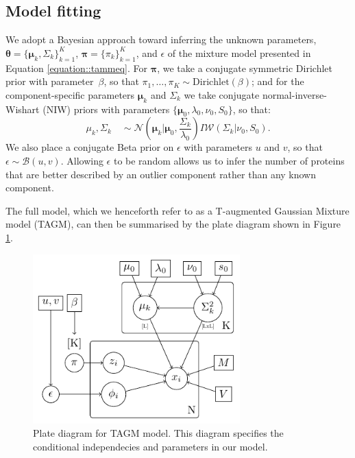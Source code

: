 \documentclass[12pt,english]{article}
\begin{document}
\subsection{Model fitting}
We adopt a Bayesian approach toward inferring the unknown parameters, $\boldsymbol{\theta} = \{\boldsymbol{\mu}_k, \Sigma_k \}_{k = 1}^K$, $\boldsymbol{\pi} = \{\pi_k\}_{k = 1}^K$, and $\epsilon$ of the mixture model presented in Equation \eqref{equation::tammeq}.  For $\boldsymbol{\pi}$, we take a conjugate symmetric Dirichlet prior with parameter~$\beta$, so that $\pi_1, \ldots, \pi_K \sim \mbox{Dirichlet}(\beta)$; and for the component-specific parameters $\boldsymbol{\mu}_k$ and $\Sigma_k$ we take conjugate normal-inverse-Wishart (NIW) priors with parameters $\{\boldsymbol{\mu}_0, \lambda_0, \nu_0, S_0\}$, so that:
\begin{equation} \label{equation::prior}
  \mu_k, \Sigma_k \quad \sim \mathcal{N}\left(\boldsymbol{\mu}_k|\boldsymbol{\mu}_0, \frac{\Sigma_{k}}{\lambda_0}\right)I\mathcal{W}\left(\Sigma_{k}|\nu_0, S_0\right).
\end{equation}
We also place a conjugate Beta prior on $\epsilon$ with parameters $u$ and $v$, so that $\epsilon \sim \mathcal{B}(u,v)$.
Allowing $\epsilon$ to be random allows us to infer the number of proteins that are
better described by an outlier component rather than any known component.

The full model, which we henceforth refer to as a T-augmented Gaussian Mixture model (TAGM), can then be summarised by
the plate diagram shown in Figure \ref{plateDiagram}.

\begin{figure}[H]
  \includegraphics[width=8cm]{graphmodel2.pdf}
  \centering
  \caption{Plate diagram for TAGM model. This diagram specifies the conditional independecies and parameters in our model.}\label{plateDiagram}
\end{figure}
\end{document}
